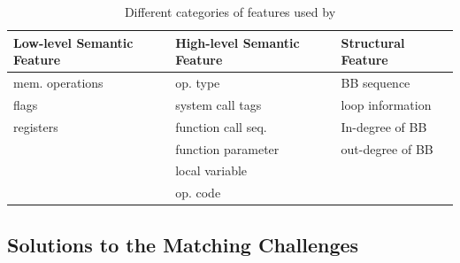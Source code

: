 \begin{table}[t]
  \centering
  \caption{Different categories of features used by \toolNew}
    \begin{tabular}{|p{2.5cm}|p{2.5cm}|p{2.5cm}|}
    \hline
    \textbf{Low-level Semantic Feature} & \textbf{High-level Semantic Feature} & \textbf{Structural Feature}\\ %
    \hline
    \multicolumn{1}{|l|}{mem. operations} & op. type & \multicolumn{1}{l|}{BB sequence} \\ %
      flags    & system call tags & \multicolumn{1}{l|}{loop information}  \\ %
      registers    & function call seq. & \multicolumn{1}{l|}{In-degree of BB}  \\ %
          & function parameter & \multicolumn{1}{l|}{out-degree of BB}  \\ %
          & local variable &        \\ %
          & op. code &        \\ %
          \hline
    \end{tabular}%

  \label{tab:features}%
\end{table}%


\subsection{Solutions to the Matching Challenges} \label{subsec:sem_chall_sol}

